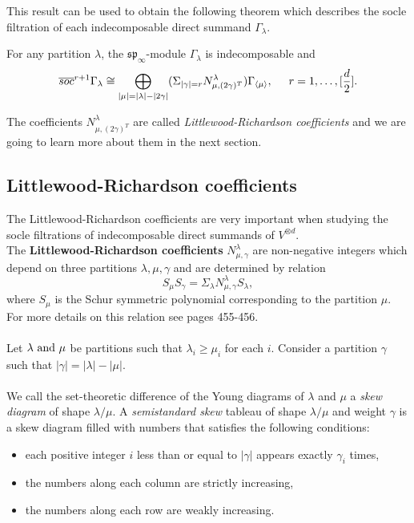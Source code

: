 This result can be used to obtain the following theorem which describes the socle filtration of each indecomposable direct summand $\Gamma_{ \lambda}$.
\begin{thm}
For any partition $\lambda$, the $\mathfrak{sp}_{\infty}$-module $\Gamma_{\lambda}$ is indecomposable and
$$\overline{soc}^{r+1}\Gamma_{\lambda}\cong \bigoplus_{|\mu|=|\lambda|-|2\gamma|} (\Sigma_{|\gamma|=r}N^{\lambda}_{\mu,(2\gamma)^{T}})\Gamma_{\langle \mu \rangle}, \hspace{5mm} r=1,\dots,[ \frac{d}{2}].$$
\end{thm}
The coefficients $N^{\lambda}_{\mu,(2\gamma)^{T}}$ are called \textit{Littlewood-Richardson coefficients} and we are going to learn more about them in the next section.


\subsection{Littlewood-Richardson coefficients}
\normalsize 
The Littlewood-Richardson coefficients are very important when studying the socle filtrations of indecomposable direct summands of $V^{\otimes d}$.
\vspace{2mm}
\\ The \textbf{Littlewood-Richardson coefficients} $N^{\lambda}_{\mu,\gamma}$ are non-negative integers which depend on three partitions $\lambda, \mu, \gamma$ and are determined by relation
$$S_{\mu}S_{\gamma}=\Sigma_{\lambda}N^{\lambda}_{\mu,\gamma}S_{\lambda},$$
where $S_{\mu}$ is the Schur symmetric polynomial corresponding to the partition $\mu$. For more details on this relation see \cite{fulton} pages 455-456.\\ \\Let $\lambda \textnormal{ and }\mu$ be partitions such that $\lambda_i\ge\mu_i$ for each $i$. Consider a partition $\gamma$ such that $|\gamma|=|\lambda|-|\mu|$.\\ \\We call the set-theoretic difference of the Young diagrams of $\lambda$ and $\mu$   a \emph{skew diagram} of shape  $\lambda/\mu$. A \emph{semistandard skew} tableau of shape $\lambda/\mu$  and weight $\gamma$ is a skew diagram filled with numbers that satisfies the following conditions:
\begin{itemize}
\item{each positive integer $i$ less than or equal to $|\gamma|$ appears exactly $\gamma_{i}$ times,}
\item{the numbers along each column are strictly increasing,}
\item{the numbers along each row are weakly increasing.}
\end{itemize}
